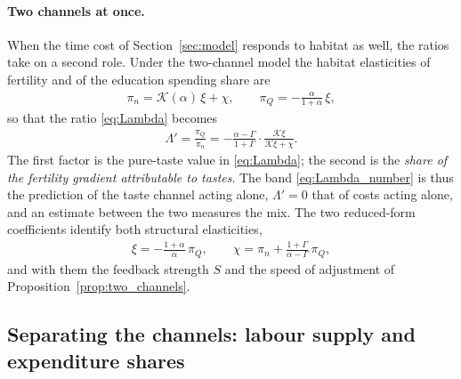 \documentclass[11pt]{article}
\begin{document}
\paragraph{Two channels at once.}
When the time cost of Section~\ref{sec:model} responds to habitat as well, the ratios take on a
second role. Under the two-channel model the habitat elasticities of fertility and of the education
spending share are
\begin{align}
\pi_n=\mathcal{K}(\alpha)\,\xi+\chi,
\qquad
\pi_Q=-\frac{\alpha}{1+\alpha}\,\xi,
\label{eq:two_elasticities}
\end{align}
so that the ratio \eqref{eq:Lambda} becomes
\begin{align}
\Lambda'=\frac{\pi_Q}{\pi_n}
=-\frac{\alpha-\Gamma}{1+\Gamma}\cdot\frac{\mathcal{K}\xi}{\mathcal{K}\xi+\chi} .
\label{eq:Lambda_share}
\end{align}
The first factor is the pure-taste value in \eqref{eq:Lambda}; the second is the \emph{share of the
fertility gradient attributable to tastes}. The band \eqref{eq:Lambda_number} is thus the
prediction of the taste channel acting alone, $\Lambda'=0$ that of costs acting alone, and an
estimate between the two measures the mix. The two reduced-form coefficients identify both
structural elasticities,
\begin{align}
\xi=-\frac{1+\alpha}{\alpha}\,\pi_Q,
\qquad
\chi=\pi_n+\frac{1+\Gamma}{\alpha-\Gamma}\,\pi_Q,
\label{eq:decomposition}
\end{align}
and with them the feedback strength $S$ and the speed of adjustment of
Proposition~\ref{prop:two_channels}.

\subsection{Separating the channels: labour supply and expenditure shares}
\label{sub:ltest}
\end{document}
